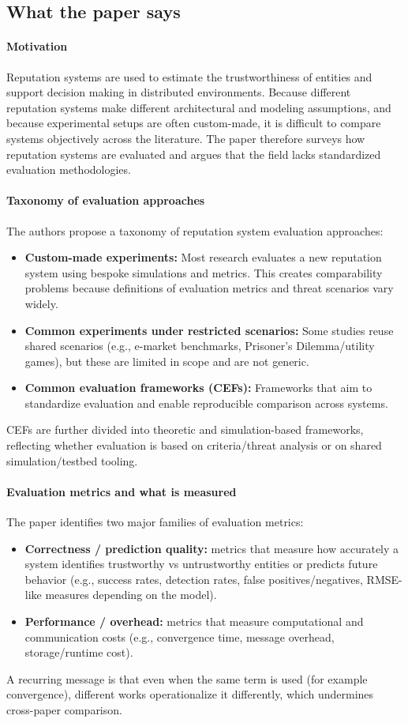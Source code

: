 \documentclass[11pt,a4paper]{article}
\begin{document}
\subsection{What the paper says}
\paragraph{Motivation}
Reputation systems are used to estimate the trustworthiness of entities and support decision making in distributed environments. Because different reputation systems make different architectural and modeling assumptions, and because experimental setups are often custom-made, it is difficult to compare systems objectively across the literature. The paper therefore surveys how reputation systems are evaluated and argues that the field lacks standardized evaluation methodologies.

\paragraph{Taxonomy of evaluation approaches}
The authors propose a taxonomy of reputation system evaluation approaches:
\begin{itemize}[leftmargin=*]
  \item \textbf{Custom-made experiments:} Most research evaluates a new reputation system using bespoke simulations and metrics. This creates comparability problems because definitions of evaluation metrics and threat scenarios vary widely.
  \item \textbf{Common experiments under restricted scenarios:} Some studies reuse shared scenarios (e.g., e-market benchmarks, Prisoner's Dilemma/utility games), but these are limited in scope and are not generic.
  \item \textbf{Common evaluation frameworks (CEFs):} Frameworks that aim to standardize evaluation and enable reproducible comparison across systems.
\end{itemize}
CEFs are further divided into theoretic and simulation-based frameworks, reflecting whether evaluation is based on criteria/threat analysis or on shared simulation/testbed tooling.

\paragraph{Evaluation metrics and what is measured}
The paper identifies two major families of evaluation metrics:
\begin{itemize}[leftmargin=*]
  \item \textbf{Correctness / prediction quality:} metrics that measure how accurately a system identifies trustworthy vs untrustworthy entities or predicts future behavior (e.g., success rates, detection rates, false positives/negatives, RMSE-like measures depending on the model).
  \item \textbf{Performance / overhead:} metrics that measure computational and communication costs (e.g., convergence time, message overhead, storage/runtime cost).
\end{itemize}
A recurring message is that even when the same term is used (for example convergence), different works operationalize it differently, which undermines cross-paper comparison.
\end{document}
